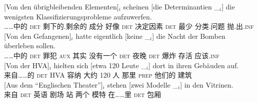 \begin{sloppypar}
\eal
\ex 
\gll {}[Von den übrigbleibenden Elementen]$_i$ scheinen [die Determinantien \_$_i$] die wenigsten Klassifizierungsprobleme aufzuwerfen.\footnotemark\\
     \spacebr{}……中的 \textsc{det} 剩下的.剩余的 成分 好像 \spacebr{}\textsc{det} 决定因素 {} \textsc{det} 最少 分类.问题 抛.出.\textsc{inf}\\
\ex\label{bsp-von-den-gefangenen} 
\gll {}[Von den Gefangenen]$_i$ hatte eigentlich [keine \_$_i$] die Nacht der Bomben überleben sollen.\footnotemark\\
	 {}\spacebr{}……中的 \textsc{det} 罪犯 \textsc{aux} 其实 \spacebr{}没有一个 {} \textsc{det} 夜晚 \textsc{det} 爆炸 存活 应该.\textsc{inf}\\
\ex 
\gll {}[Von der HVA]$_i$ hielten sich [etwa 120 Leute \_$_i$] dort in ihren Gebäuden auf.\footnotemark\\
	 {}\spacebr{}来自……的 \textsc{det} HVA 容纳  \spacebr{}大约 120 人 {} 那里 \textsc{prep} 他们的 建筑 \prt{}\\
\ex 
\gll {}[Aus dem "`Englischen Theater"']$_i$ stehen [zwei Modelle \_$_i$] in den Vitrinen.\footnotemark\hspace{-3pt}\\
	 {}\spacebr{}来自 \textsc{det} 英语 剧场 站 \spacebr{}两个 模特 {} 在……里 \textsc{det} 包厢\\

\end{sloppypar}
